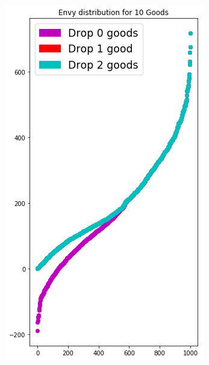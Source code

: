 \begin{figure}[h!]
  \centering
  \begin{subfigure}[b]{0.47\linewidth}
    \includegraphics[width=\linewidth]{images/envy_density/envy_density_us29.png}
    \caption{}
  \end{subfigure}
  \begin{subfigure}[b]{0.47\linewidth}

\end{subfigure}
\end{figure}
